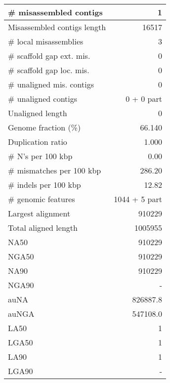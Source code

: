\documentclass[12pt,a4paper]{article}
\begin{document}
\begin{table}[ht]
\begin{center}
\begin{tabular}{|l*{1}{|r}|}
\# misassembled contigs & 1 \\ \hline
Misassembled contigs length & 16517 \\ \hline
\# local misassemblies & 3 \\ \hline
\# scaffold gap ext. mis. & 0 \\ \hline
\# scaffold gap loc. mis. & 0 \\ \hline
\# unaligned mis. contigs & 0 \\ \hline
\# unaligned contigs & 0 + 0 part \\ \hline
Unaligned length & 0 \\ \hline
Genome fraction (\%) & 66.140 \\ \hline
Duplication ratio & 1.000 \\ \hline
\# N's per 100 kbp & 0.00 \\ \hline
\# mismatches per 100 kbp & 286.20 \\ \hline
\# indels per 100 kbp & 12.82 \\ \hline
\# genomic features & 1044 + 5 part \\ \hline
Largest alignment & 910229 \\ \hline
Total aligned length & 1005955 \\ \hline
NA50 & 910229 \\ \hline
NGA50 & 910229 \\ \hline
NA90 & 910229 \\ \hline
NGA90 & - \\ \hline
auNA & 826887.8 \\ \hline
auNGA & 547108.0 \\ \hline
LA50 & 1 \\ \hline
LGA50 & 1 \\ \hline
LA90 & 1 \\ \hline
LGA90 & - \\ \hline
\end{tabular}
\end{center}
\end{table}
\end{document}
